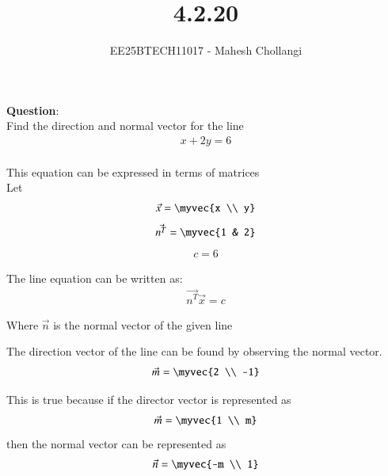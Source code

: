 \documentclass[journal]{IEEEtran}
\begin{document}

\vspace{3cm}

\title{4.2.20}
\author{EE25BTECH11017 - Mahesh Chollangi}
\maketitle
{\let\newpage\relax\maketitle}

\renewcommand{\thefigure}{\theenumi}
\renewcommand{\thetable}{\theenumi}
\setlength{\intextsep}{10pt} %


\renewcommand{\thetable}{\theenumi}

\textbf{Question}:\\
Find the direction and normal vector for the line 
\begin{align}
x + 2y = 6
\end{align}
\solution \\


This equation can be expressed in terms of matrices\\
Let
\begin{align}
\vec{x} = \myvec{x \\ y}
\end{align}
\begin{align}
\vec{n^T} = \myvec{1 & 2}
\end{align}
\begin{align}
c = 6
\end{align}

The line equation can be written as:
\begin{align}
\vec{n^T}  \vec{x} = c
\end{align}

Where $\vec{n}$ is the normal vector of the given line

The direction vector of the line can be found by observing the normal vector.
\begin{align}
\vec{m} = \myvec{2 \\ -1}
\end{align}


This is true because if the director vector is represented as 
\begin{align}
\vec{m}  = \myvec{1 \\ m}    
\end{align}
then the normal vector can be represented as 
\begin{align}
\vec{n} = \myvec{-m \\ 1}
\end{align}
\end{document}
